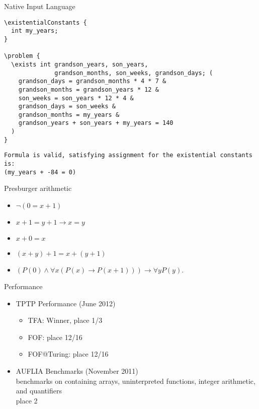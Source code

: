 \documentclass{beamer} %
\newenvironment{page}[1]
	{\begin{frame}[containsverbatim,c]{#1}}
    	{\end{frame}}
\begin{document}
\begin{page}{Native Input Language}

\begin{lstlisting}
\existentialConstants {
  int my_years;
}

\problem {
  \exists int grandson_years, son_years,
              grandson_months, son_weeks, grandson_days; (
    grandson_days = grandson_months * 4 * 7 &
    grandson_months = grandson_years * 12 &
    son_weeks = son_years * 12 * 4 &
    grandson_days = son_weeks &
    grandson_months = my_years &
    grandson_years + son_years + my_years = 140
  )
}
\end{lstlisting}
\begin{lstlisting}
Formula is valid, satisfying assignment for the existential constants is:
(my_years + -84 = 0)
\end{lstlisting}

\end{page}
\begin{page}{Presburger arithmetic}

\begin{itemize}
\item $\lnot(0 = x + 1)$
\item $x + 1 = y + 1 \to x = y$
\item $x + 0 = x$
\item $(x + y) + 1 = x + (y + 1)$
\item $(P(0) \land \forall x(P(x) \to P(x + 1))) \to \forall y P(y).$
\end{itemize}

\end{page}
\begin{page}{Performance}

\begin{itemize}
	\item TPTP Performance (June 2012)
	\begin{itemize}
		\item TFA: Winner, place 1/3
		\item FOF: place 12/16
		\item FOF@Turing: place 12/16
	\end{itemize}
	\item AUFLIA Benchmarks (November 2011) \\
		benchmarks on containing arrays, uninterpreted functions, integer arithmetic, and quantifiers \\
		place 2
\end{itemize}

\end{page}
\end{document}
